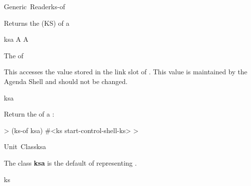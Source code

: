 \documentclass[10pt,twoside,english,pdftex]{article}
\begin{document}
\begin{functiondoc}{Generic~Reader}{ks-of}{ 
    \returns{} }
%
%
%

\fnsyntax

\fnpurpose Returns the  (KS) 
of a 

\fnmethods
{}

\fnpackage {}

\fnmodule {}

\fnargs
\begin{args}{ksa}
\arg[ksa] A 
\arg[ks] A 
\end{args}

\fnreturns The   of 
  
\fndescription 
This  accesses the value stored in the
 link slot of .  This value is
maintained by the Agenda Shell and should not be changed.

\begin{alsos}{ksa}
\also[ks]
\also[ksa]
\end{alsos}

\fnexample
Return the  of a :
%
\W\supp
\begin{example}
  > (ks-of ksa)
  #<ks start-control-shell-ks>
  >
\end{example}

\end{functiondoc}


\begin{functiondoc}{Unit~Class}{ksa}{}
%
%

\fnsyntax

\fnpackage {}

\fnmodule {}

\fndescription 
The class \textbf{ksa} is the default  of
 representing .

\begin{alsos}{ks}
\also[ks]
\end{alsos}

\end{functiondoc}
\end{document}
